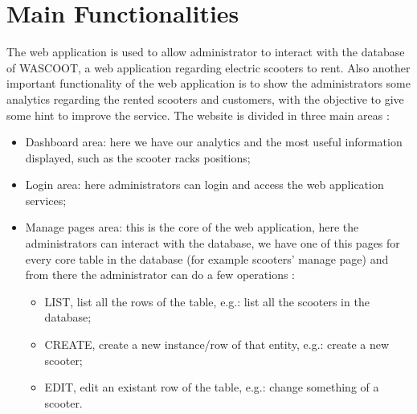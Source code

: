 \section{Main Functionalities}
The web application is used to allow administrator to interact with the database of WASCOOT, a web application regarding electric scooters to rent.
Also another important functionality of the web application  is to show the administrators some analytics regarding the rented scooters and customers, with the objective to give some hint to improve the service. The website is divided in three main areas :
\begin{itemize}
    \item Dashboard area: here we have our analytics and the most useful information displayed, such as the scooter racks positions;
    \item Login area: here administrators can login and access the web application services;
    \item Manage pages area: this is the core of the web application, here the administrators can interact with the database, we have one of this pages for every core table in the database (for example scooters' manage page) and from there the administrator can do a few operations :
    \begin{itemize}
        \item LIST, list all the rows of the table, e.g.: list all the scooters in the database;
        \item CREATE, create a new instance/row of that entity, e.g.: create a new scooter;
        \item EDIT, edit an existant row of the table, e.g.: change something of a scooter.
    \end{itemize}
\end{itemize}